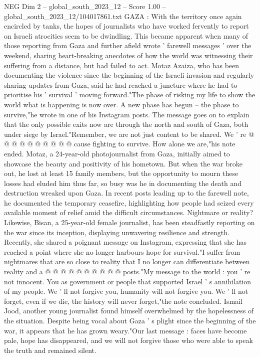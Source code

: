 \begin{textsample}{NEG Dim 2 – global\_south\_2023\_12 – Score 1.00 – global\_south\_2023\_12/104017861.txt}  \label{ex:f2_neg_287}
GAZA : With the territory once again encircled by tanks, the hopes of journalists who have worked fervently to report on Israeli atrocities seem to be dwindling.
This became apparent when many of those reporting from Gaza and further afield wrote ' farewell messages ' over the weekend, sharing heart-breaking anecdotes of how the world was witnessing their suffering from a distance, but had failed to act.
Motaz Azaiza, who has been documenting the violence since the beginning of the Israeli invasion and regularly sharing updates from Gaza, said he had reached a juncture where he had to prioritise his ' survival ' moving forward."The phase of risking my life to show the world what is happening is now over.
A new phase has begun -- the phase to survive,"he wrote in one of his Instagram posts.
The message goes on to explain that the only possible exits now are through the north and south of Gaza, both under siege by Israel."Remember, we are not just content to be shared.
We ' re @ @ @ @ @ @ @ @ @ @ cause fighting to survive.
How alone we are,"his note ended.
Motaz, a 24-year-old photojournalist from Gaza, initially aimed to showcase the beauty and positivity of his hometown.
But when the war broke out, he lost at least 15 family members, but the opportunity to mourn these losses had eluded him thus far, so busy was he in documenting the death and destruction wreaked upon Gaza.
In recent posts leading up to the farewell note, he documented the temporary ceasefire, highlighting how people had seized every available moment of relief amid the difficult circumstances.
Nightmare or reality?
Likewise, Bisan, a 25-year-old female journalist, has been steadfastly reporting on the war since its inception, displaying unwavering resilience and strength.
Recently, she shared a poignant message on Instagram, expressing that she has reached a point where she no longer harbours hope for survival."I suffer from nightmares that are so close to reality that I no longer can differentiate between reality and a @ @ @ @ @ @ @ @ @ @ posts."My message to the world : you ' re not innocent.
You as government or people that supported Israel ' s annihilation of my people.
We ' ll not forgive you, humanity will not forgive you.
We ' ll not forget, even if we die, the history will never forget,"the note concluded.
Ismail Jood, another young journalist found himself overwhelmed by the hopelessness of the situation.
Despite being vocal about Gaza ' s plight since the beginning of the war, it appears that he has grown weary."Our last message : faces have become pale, hope has disappeared, and we will not forgive those who were able to speak the truth and remained silent.

\end{textsample}
